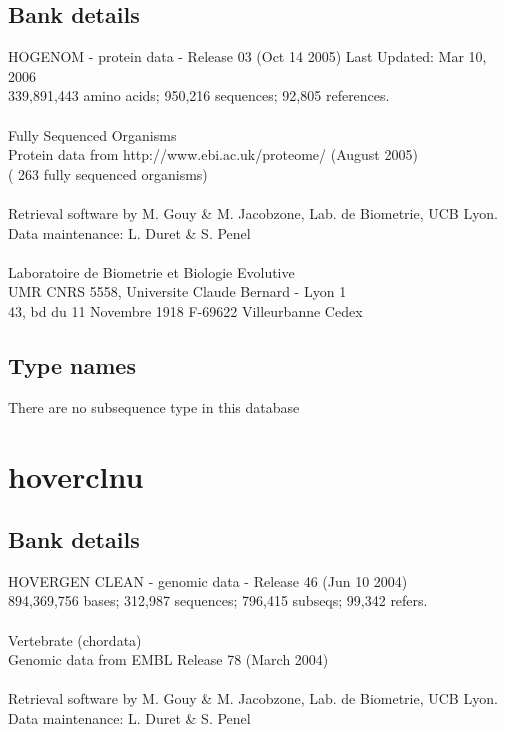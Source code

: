 \documentclass{article}
\begin{document}
\begin{Schunk}
\subsection{Bank details}
HOGENOM - protein data - Release 03 (Oct 14 2005) Last Updated: Mar 10, 2006\\
339,891,443 amino acids; 950,216 sequences; 92,805 references.\\
\\
Fully Sequenced Organisms\\
Protein data from http://www.ebi.ac.uk/proteome/ (August 2005)\\
( 263 fully sequenced organisms)\\
\\
Retrieval software by M. Gouy \& M. Jacobzone, Lab. de Biometrie, UCB Lyon.\\
Data maintenance: L. Duret \& S. Penel\\
\\
Laboratoire de Biometrie et Biologie Evolutive\\
UMR CNRS 5558, Universite Claude Bernard - Lyon 1\\
43, bd du 11 Novembre 1918 F-69622 Villeurbanne Cedex\\


\subsection{Type names}
There are no subsequence type in this database
\section{ hoverclnu }
\subsection{Bank details}
HOVERGEN CLEAN - genomic data - Release 46 (Jun 10 2004)\\
894,369,756 bases; 312,987 sequences; 796,415 subseqs; 99,342 refers.\\
\\
Vertebrate (chordata)\\
Genomic data from EMBL Release 78  (March 2004)\\
\\
Retrieval software by M. Gouy \& M. Jacobzone, Lab. de Biometrie, UCB Lyon.\\
Data maintenance: L. Duret \& S. Penel\\



\end{Schunk}
\end{document}
